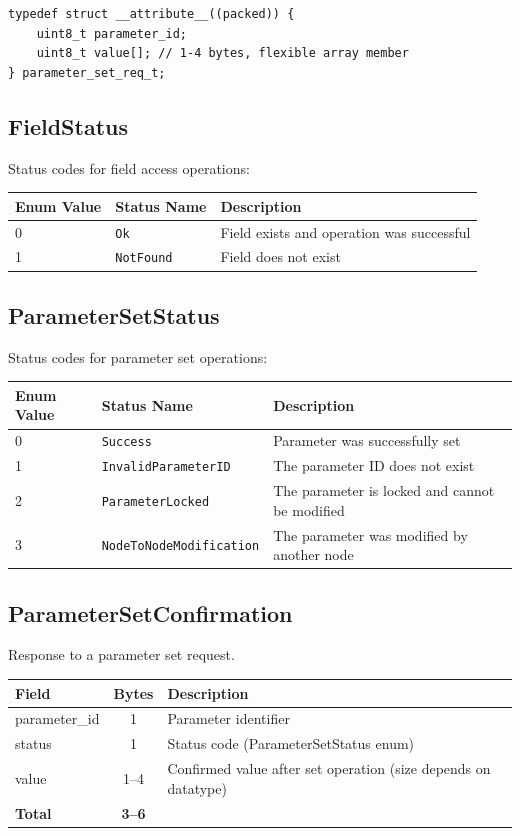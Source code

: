 \begin{lstlisting}[caption={ParameterSetReq struct}]
typedef struct __attribute__((packed)) {
    uint8_t parameter_id;
    uint8_t value[]; // 1-4 bytes, flexible array member
} parameter_set_req_t;
\end{lstlisting}

\subsection{FieldStatus}\label{subsec:FieldStatus}
Status codes for field access operations:
\begin{center}
\begin{tabular}{l l l}
\toprule
Enum Value & Status Name & Description \\
\midrule
0 & \texttt{Ok} & Field exists and operation was successful \\
1 & \texttt{NotFound} & Field does not exist \\
\bottomrule
\end{tabular}
\end{center}

\subsection{ParameterSetStatus}\label{subsec:ParameterSetStatus}
Status codes for parameter set operations:
\begin{center}
\begin{tabular}{l l l}
\toprule
Enum Value & Status Name & Description \\
\midrule
0 & \texttt{Success} & Parameter was successfully set \\
1 & \texttt{InvalidParameterID} & The parameter ID does not exist \\
2 & \texttt{ParameterLocked} & The parameter is locked and cannot be modified \\
3 & \texttt{NodeToNodeModification} & The parameter was modified by another node\\
\bottomrule
\end{tabular}
\end{center}

\subsection{ParameterSetConfirmation}\label{struct:ParameterSetConfirmation}
Response to a parameter set request.

\begin{center}
\begin{tabular}{l c l}
\toprule
Field & Bytes & Description \\
\midrule
parameter\_id & 1 & Parameter identifier \\
status & 1 & Status code (ParameterSetStatus enum) \\
value & 1--4 & Confirmed value after set operation (size depends on datatype) \\
\midrule
\textbf{Total} & \textbf{3--6} & \\
\bottomrule
\end{tabular}
\end{center}

